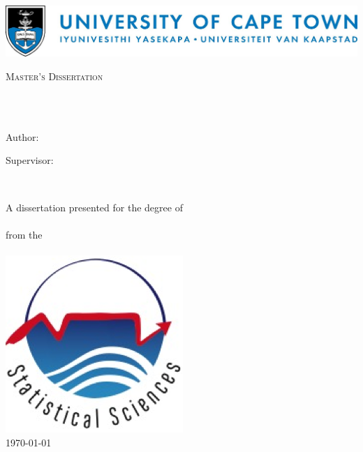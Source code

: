 \documentclass[
12pt, %
english, %
singlespacing, %
parskip, %
headsepline, %
openany %
]{MastersDoctoralThesis} %
\author{Pavan \textsc{Singh}} %
\numberwithin{theorem}{section}
\numberwithin{remark}{section}
\numberwithin{assumption}{section}
\begin{document}
\frontmatter %
\pagestyle{plain} %


\begin{titlepage}
\begin{center}

\includegraphics*[width=\linewidth]{Figures/UCTLogoLong.jpg} 

\vspace*{.06\textheight}
{\scshape\LARGE \univname\par}\vspace{1.0cm} %
\textsc{\Large Master's Dissertation}\\[0.5cm] %

\HRule \\[0.4cm] %
{\large \bfseries \ttitle\par}\vspace{0.4cm} %
\HRule \\[1.5cm] %
 
\begin{minipage}[t]{0.4\textwidth}
\begin{flushleft} \large
{Author:}\\
\authorname
\end{flushleft}
\end{minipage}
\begin{minipage}[t]{0.4\textwidth}
\begin{flushright} \large
{Supervisor:} \\
\supname
\end{flushright}
\end{minipage}\\[1cm]

\vfill

\large {A dissertation presented for the degree of \\ \degreename \ }\\[0.3cm] %
{from the}\\[0.4cm]
\deptname\\[1cm] %
\includegraphics*[width=0.25\linewidth]{Figures/statslogo.png} \\[1cm]
{\large \today}\\[4cm] %
 

\end{center}
\end{titlepage}
\end{document}
